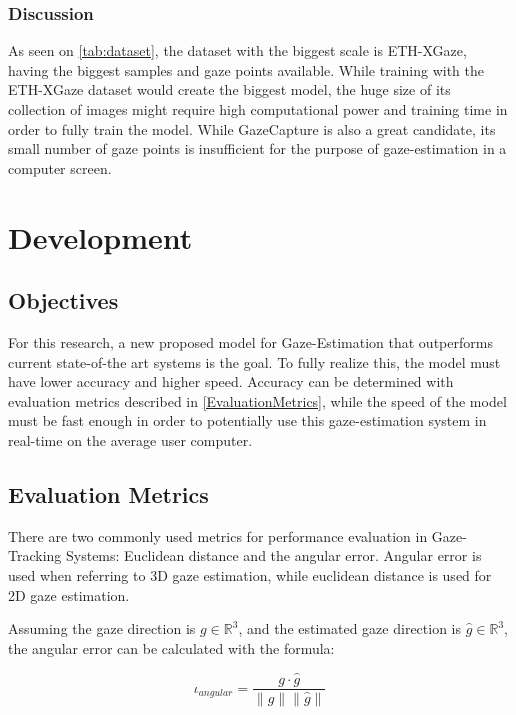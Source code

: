 \subsection{Discussion}
As seen on \autoref{tab:dataset}, the dataset with the biggest scale is ETH-XGaze, having the biggest samples and gaze points available. 
While training with the ETH-XGaze dataset would create the biggest model, the huge size of its collection of images might require high computational
power and training time in order to fully train the model. While GazeCapture is also a great candidate, its small number of gaze points 
is insufficient for the purpose of gaze-estimation in a computer screen.

\chapter{Development}
\label{Chap3}


\section{Objectives}
For this research, a new proposed model for Gaze-Estimation that outperforms current state-of-the art systems is 
the goal. To fully realize this, the model must have lower accuracy and higher speed.
Accuracy can be determined with evaluation metrics described in \autoref{EvaluationMetrics}, while the speed of the model
must be fast enough in order to potentially use this gaze-estimation system in real-time on the average user computer.

\section{Evaluation Metrics}
\label{EvaluationMetrics}
There are two commonly used metrics for performance evaluation in Gaze-Tracking Systems:
Euclidean distance and the angular error. Angular error is used when referring to 3D gaze estimation, while euclidean distance is used for 2D gaze estimation.

Assuming the gaze direction is \boldmath $g \in \mathbb{R}^3$, and the estimated gaze direction is
\boldmath $\hat{g}  \in \mathbb{R}^3$, the angular error can be calculated with the formula:

\begin{equation} \iota _{angular} = \frac{g \cdot  \hat{g} }{ \|g\|\|\hat{g}\| } \end{equation}


